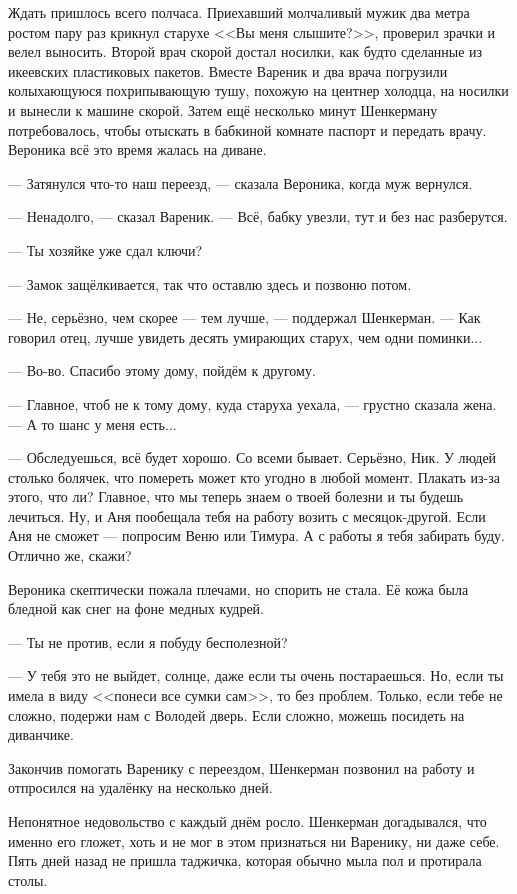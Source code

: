 Ждать пришлось всего полчаса.
Приехавший молчаливый мужик два метра ростом пару раз крикнул старухе <<Вы меня слышите?>>, проверил зрачки и велел выносить.
Второй врач скорой достал носилки, как будто сделанные из икеевских пластиковых пакетов.
Вместе Вареник и два врача погрузили колыхающуюся похрипывающую тушу, похожую на центнер холодца, на носилки и вынесли к машине скорой.
Затем ещё несколько минут Шенкерману потребовалось, чтобы отыскать в бабкиной комнате паспорт и передать врачу.
Вероника всё это время жалась на диване.

--- Затянулся что-то наш переезд, --- сказала Вероника, когда муж вернулся.

--- Ненадолго, --- сказал Вареник.
--- Всё, бабку увезли, тут и без нас разберутся.

--- Ты хозяйке уже сдал ключи?

--- Замок защёлкивается, так что оставлю здесь и позвоню потом.

--- Не, серьёзно, чем скорее --- тем лучше, --- поддержал Шенкерман.
--- Как говорил отец, лучше увидеть десять умирающих старух, чем одни поминки...

--- Во-во.
Спасибо этому дому, пойдём к другому.

--- Главное, чтоб не к тому дому, куда старуха уехала, --- грустно сказала жена.
--- А то шанс у меня есть...

--- Обследуешься, всё будет хорошо.
Со всеми бывает.
Серьёзно, Ник.
У людей столько болячек, что помереть может кто угодно в любой момент.
Плакать из-за этого, что ли?
Главное, что мы теперь знаем о твоей болезни и ты будешь лечиться.
Ну, и Аня пообещала тебя на работу возить с месяцок-другой.
Если Аня не сможет --- попросим Веню или Тимура.
А с работы я тебя забирать буду.
Отлично же, скажи?

Вероника скептически пожала плечами, но спорить не стала.
Её кожа была бледной как снег на фоне медных кудрей.

--- Ты не против, если я побуду бесполезной?

--- У тебя это не выйдет, солнце, даже если ты очень постараешься.
Но, если ты имела в виду <<понеси все сумки сам>>, то без проблем.
Только, если тебе не сложно, подержи нам с Володей дверь.
Если сложно, можешь посидеть на диванчике.

\asterism

Закончив помогать Варенику с переездом, Шенкерман позвонил на работу и отпросился на удалёнку на несколько дней.

Непонятное недовольство с каждый днём росло.
Шенкерман догадывался, что именно его гложет, хоть и не мог в этом признаться ни Варенику, ни даже себе.
Пять дней назад не пришла таджичка, которая обычно мыла пол и протирала столы.

